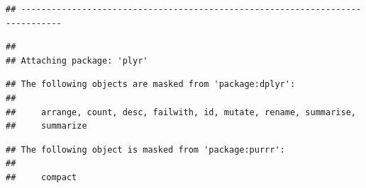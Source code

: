 \documentclass[
]{article}
\newenvironment{Shaded}{\begin{snugshade}}{\end{snugshade}}
\newcommand{\CommentTok}[1]{\textcolor[rgb]{0.56,0.35,0.01}{\textit{#1}}}
\newcommand{\ControlFlowTok}[1]{\textcolor[rgb]{0.13,0.29,0.53}{\textbf{#1}}}
\newcommand{\DataTypeTok}[1]{\textcolor[rgb]{0.13,0.29,0.53}{#1}}
\newcommand{\DecValTok}[1]{\textcolor[rgb]{0.00,0.00,0.81}{#1}}
\newcommand{\KeywordTok}[1]{\textcolor[rgb]{0.13,0.29,0.53}{\textbf{#1}}}
\newcommand{\NormalTok}[1]{#1}
\newcommand{\OperatorTok}[1]{\textcolor[rgb]{0.81,0.36,0.00}{\textbf{#1}}}
\newcommand{\StringTok}[1]{\textcolor[rgb]{0.31,0.60,0.02}{#1}}
\begin{document}
\begin{verbatim}
## ------------------------------------------------------------------------------
\end{verbatim}

\begin{verbatim}
## 
## Attaching package: 'plyr'
\end{verbatim}

\begin{verbatim}
## The following objects are masked from 'package:dplyr':
## 
##     arrange, count, desc, failwith, id, mutate, rename, summarise,
##     summarize
\end{verbatim}

\begin{verbatim}
## The following object is masked from 'package:purrr':
## 
##     compact
\end{verbatim}

\begin{Shaded}
\end{Shaded}
\end{document}
